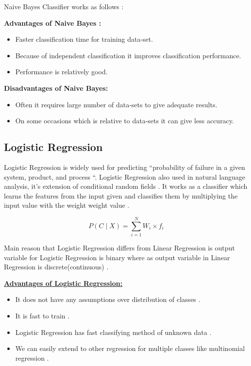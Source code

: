 \documentclass[sigconf]{acmart}
\begin{document}
Naive Bayes Classifier works as follows \cite{Sayali}:

\textbf{Advantages of Naive Bayes \cite{Sayali}:}
\begin{itemize}
\item Faster classification time for training data-set.
\item Because of independent classification it improves classification performance.
\item Performance is relatively good. 
\end{itemize}

\textbf{Disadvantages of Naive Bayes\cite{Sayali}:}

\begin{itemize}
\item Often it requires large number of data-sets to give adequate results.
\item On some occasions which is relative to data-sets it can give less accuracy.
\end{itemize}

\subsection{Logistic Regression}

Logistic Regression is widely used for predicting ``probability of failure in a given system, product, and process \cite{adarsh}``. Logistic Regression also used in natural language analysis, it's extension of conditional random fields \cite{adarsh}. It works as a classifier which learns the features from the input given and classifies them by multiplying the input value with the weight weight value \cite{tweet-logistic}.

\begin{equation}
P(C \mid X) = \sum_{i=1}^{N} W_i \times f_i 
\end{equation}

\par Main reason that Logistic Regression differs from Linear Regression is output variable for Logistic Regression is binary where as output variable in Linear Regression is discrete(continuous) \cite{fang-logistic}. 

\textbf{\underline{Advantages of Logistic Regression:}}
\begin{itemize}
\item It does not have any assumptions over distribution of classes \cite{www-washington}.
\item It is fast to train \cite{www-washington}.
\item Logistic Regression has fast classifying method of unknown data \cite{www-washington}.
\item We can easily extend to other regression for multiple classes like multinomial regression \cite{www-washington}. 
\end{itemize}
\end{document}
